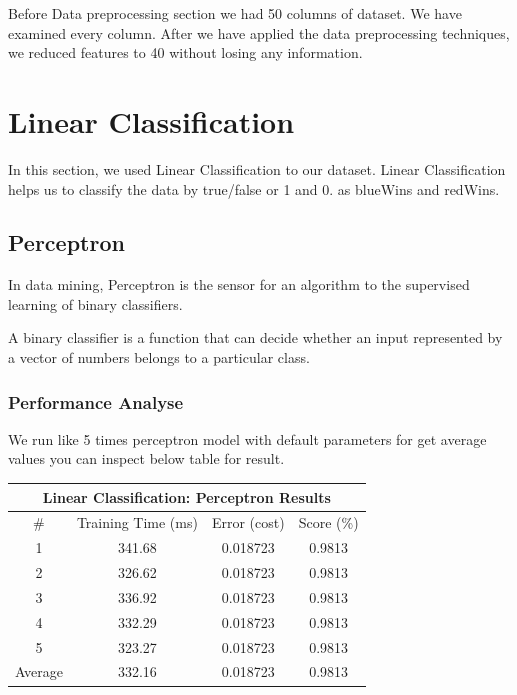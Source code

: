 \documentclass[a4paper]{article}
\begin{document}
Before Data preprocessing section we had 50 columns of dataset. We have examined every column. 
After we have applied the data preprocessing techniques, we reduced features to 40 without losing any information. 
\pagebreak



\section{Linear Classification}

In this section, we used Linear Classification to our dataset. Linear Classification helps us to classify the data by true/false or 1 and 0. as blueWins and redWins.


\subsection{Perceptron}


In data mining, Perceptron is the sensor for an algorithm to the supervised learning of binary classifiers.

\medskip

A binary classifier is a function that can decide whether an input represented by a vector of numbers belongs to a particular class.

\subsubsection{Performance Analyse}

We run like 5 times perceptron model with default parameters for get average values you can inspect below table for result.

\begin{table}[H]
\centering
\begin{tabular}{|cccc|}
\hline
\multicolumn{4}{|c|}{\textbf{Linear Classification: Perceptron Results}} \\ \hline
\#          & Training Time (ms)     & Error (cost)     & Score (\%)     \\ \hline
1           & 341.68                 & 0.018723         & 0.9813         \\
2           & 326.62                 & 0.018723         & 0.9813         \\
3           & 336.92                 & 0.018723         & 0.9813         \\
4           & 332.29                 & 0.018723         & 0.9813         \\
5           & 323.27                 & 0.018723         & 0.9813         \\ \hline
Average     & 332.16                 & 0.018723         & 0.9813         \\ \hline
\end{tabular}
\end{table}
\end{document}

